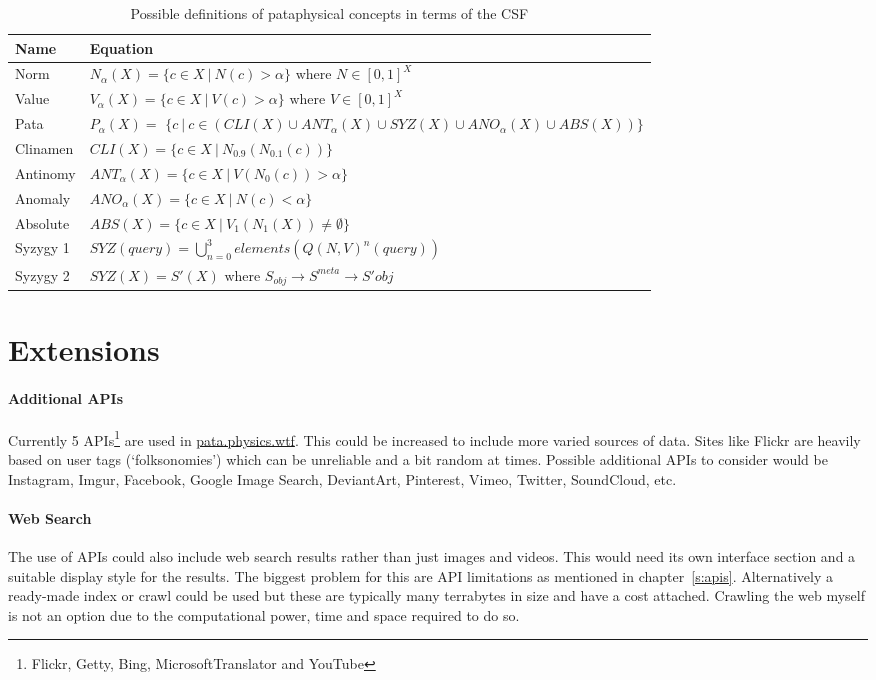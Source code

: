 \begin{table}[!htbp]
\centering
\caption[CSF pataphysical concepts]{Possible definitions of pataphysical concepts in terms of the CSF}
\label{tab:patacsf}
\begin{tabu}{XX[5]} 
\toprule
\textbf{Name} & \textbf{Equation} \\
\midrule
Norm & $N_\alpha (X) = \{c \in X \ | \ N(c)> \alpha\} \text{ where } N \in [0,1]^X$ \\
Value & $V_\alpha(X) = \{c \in X \ | \ V(c) > \alpha\} \text{ where } V \in [0,1]^X$ \\
Pata & $P_\alpha(X) = $ \newline $\{c \ | \ c \in(CLI(X)\cup ANT_\alpha(X) \cup SYZ(X) \cup ANO_\alpha(X) \cup ABS(X))\}$ \\
Clinamen & $CLI(X) = \{c \in X \ | \ N_{0.9} (N_{0.1} (c))\}$ \\
Antinomy & $ANT_\alpha(X) = \{c \in X \ | \ V(N_0(c)) > \alpha\}$ \\
Anomaly & $ANO_\alpha(X) = \{c \in X \ | \ N(c)< \alpha\}$ \\
Absolute & $ABS(X) = \{c \in X \ | \ V_1 (N_1 (X)) \neq \emptyset\}$ \\
Syzygy 1 & $SYZ(query) = \bigcup_{n=0}^{3} elements(Q(N,V)^n (query))$ \\
Syzygy 2 & $SYZ(X) = S'(X) \text{ where } S_{obj} \rightarrow S^{meta} \rightarrow S'{obj}$ \\
\bottomrule
\end{tabu}
\end{table}


\section{Extensions}
\label{s:extensions}

\paragraph{Additional APIs} 
Currently 5 \ac{API}s\footnote{Flickr, Getty, Bing, MicrosoftTranslator and YouTube} are used in \url{pata.physics.wtf}. This could be increased to include more varied sources of data. Sites like Flickr are heavily based on user tags (`folksonomies') which can be unreliable and a bit random at times. Possible additional \ac{API}s to consider would be Instagram, Imgur, Facebook, Google Image Search, DeviantArt, Pinterest, Vimeo, Twitter, SoundCloud, etc.

\paragraph{Web Search} 
The use of \ac{API}s could also include web search results rather than just images and videos. This would need its own interface section and a suitable display style for the results. The biggest problem for this are \ac{API} limitations as mentioned in chapter~\ref{s:apis}. Alternatively a ready-made index or crawl could be used but these are typically many terrabytes in size and have a cost attached. Crawling the web myself is not an option due to the computational power, time and space required to do so.

